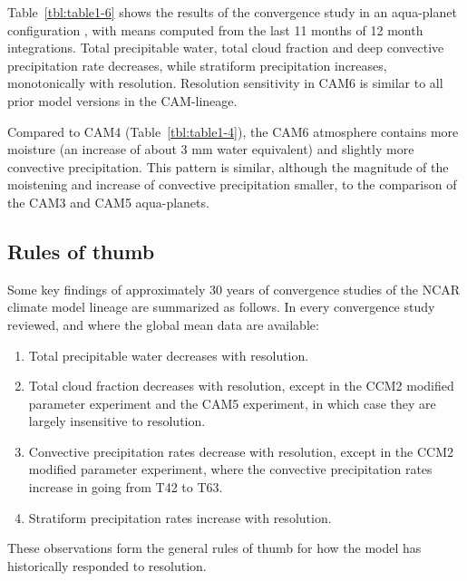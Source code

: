 Table~\ref{tbl:table1-6} shows the results of the convergence study in an aqua-planet configuration \citep[`QOBS' SST profile in][]{NH2000ASL}, with means computed from the last 11 months of 12 month integrations. Total precipitable water, total cloud fraction and deep convective precipitation rate decreases, while stratiform precipitation increases, monotonically with resolution. Resolution sensitivity in CAM6 is similar to all prior model versions in the CAM-lineage. 

Compared to CAM4 (Table~\ref{tbl:table1-4}), the CAM6 atmosphere contains more moisture (an increase of about 3 mm water equivalent) and slightly more convective precipitation. This pattern is similar, although the magnitude of the moistening and increase of convective precipitation smaller, to the comparison of the CAM3 and CAM5 aqua-planets.

\subsection{Rules of thumb}

Some key findings of approximately 30 years of convergence studies of the NCAR climate model lineage are summarized as follows. In every convergence study reviewed, and where the global mean data are available:

\begin{enumerate}
\item Total precipitable water decreases with resolution.
\item Total cloud fraction decreases with resolution, except in the CCM2 modified parameter experiment and the CAM5 experiment, in which case they are largely insensitive to resolution.
\item Convective precipitation rates decrease with resolution, except in the CCM2 modified parameter experiment, where the convective precipitation rates increase in going from T42 to T63.
\item Stratiform precipitation rates increase with resolution.
\end{enumerate}

\noindent These observations form the general rules of thumb for how the model has historically responded to resolution.
